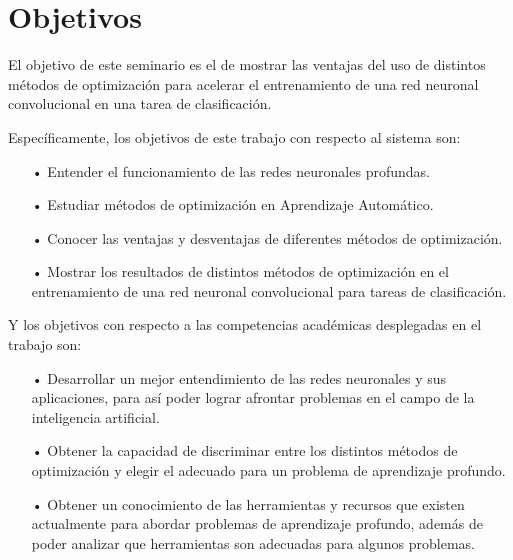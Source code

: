 
\section{Objetivos}

El objetivo de este seminario es el de mostrar las ventajas del uso de distintos métodos de optimización para acelerar el entrenamiento de una red neuronal convolucional en una tarea de clasificación.

Específicamente, los objetivos de este trabajo con respecto al sistema son:

\begin{itemize}
\item[•] Entender el funcionamiento de las redes neuronales profundas.%

\item[•] Estudiar métodos de optimización en Aprendizaje Automático.

\item[•] Conocer las ventajas y desventajas de diferentes métodos de optimización.
\item[•] Mostrar los resultados de distintos métodos de optimización en el entrenamiento de una red neuronal convolucional para tareas de clasificación.



\end{itemize}

Y los objetivos con respecto a las competencias académicas desplegadas en el trabajo son:
\begin{itemize}
\item[•] Desarrollar un mejor entendimiento de las redes neuronales y sus aplicaciones, para así poder lograr afrontar problemas en el campo de la inteligencia artificial. %
\item[•] Obtener la capacidad de discriminar entre los distintos métodos de optimización y elegir el adecuado para un problema de aprendizaje profundo.%
\item[•] Obtener un conocimiento de las herramientas y recursos que existen actualmente para abordar problemas de aprendizaje profundo, además de poder analizar que herramientas son adecuadas para algunos problemas.
\end{itemize}

